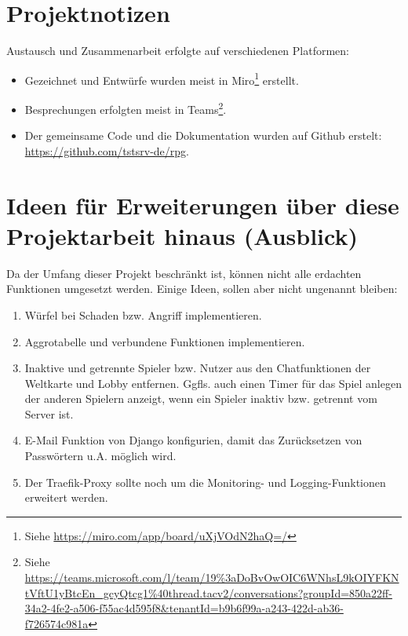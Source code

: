 


\section{Projektnotizen}

Austausch und Zusammenarbeit erfolgte auf verschiedenen Platformen:
\begin{itemize}
    \item Gezeichnet und Entwürfe wurden meist in Miro\footnote{Siehe \url{https://miro.com/app/board/uXjVOdN2haQ=/}} erstellt.
    \item Besprechungen erfolgten meist in Teams\footnote{Siehe \url{https://teams.microsoft.com/l/team/19\%3aDoBvOwOIC6WNhsL9kOIYFKNtVftU1yBtcEn_gcyQtcg1\%40thread.tacv2/conversations?groupId=850a22ff-34a2-4fe2-a506-f55ac4d595f8&tenantId=b9b6f99a-a243-422d-ab36-f726574c981a}}. 
    \item Der gemeinsame Code und die Dokumentation wurden auf Github erstelt: \url{https://github.com/tstsrv-de/rpg}. 
\end{itemize}




\section{Ideen für Erweiterungen über diese Projektarbeit hinaus (Ausblick)} \label{ausblick}

Da der Umfang dieser Projekt beschränkt ist, können nicht alle erdachten Funktionen umgesetzt werden. Einige Ideen, sollen aber nicht ungenannt bleiben: 
\begin{enumerate}
    \item Würfel bei Schaden bzw. Angriff implementieren.
    \item Aggrotabelle und verbundene Funktionen implementieren.
    \item Inaktive und getrennte Spieler bzw. Nutzer aus den Chatfunktionen der Weltkarte und Lobby entfernen. Ggfls. auch einen Timer für das Spiel anlegen der anderen Spielern anzeigt, wenn ein Spieler inaktiv bzw. getrennt vom Server ist. 
    \item E-Mail Funktion von Django konfigurien, damit das Zurücksetzen von Passwörtern u.A. möglich wird.
    \item Der Traefik-Proxy sollte noch um die Monitoring- und Logging-Funktionen erweitert werden. 
\end{enumerate}



